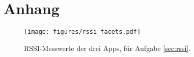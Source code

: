 \newpage
\section*{Anhang}
\begin{figure}[h]
    \centering
    \texttt{[image: figures/rssi\_facets.pdf]}
    \caption{RSSI-Messwerte der drei Apps, für Aufgabe \ref{sec:rssi}.}
    \label{rssi-facet}
\end{figure}